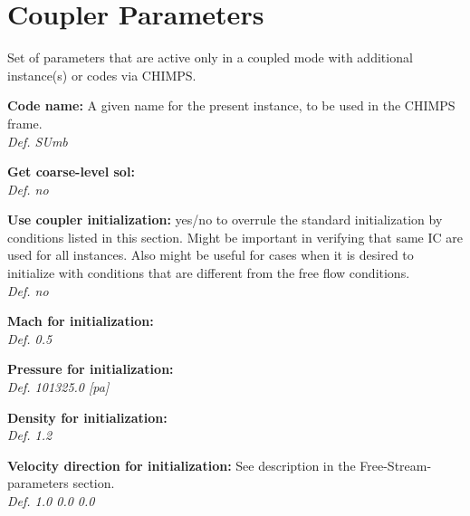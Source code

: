 \documentclass[12pt,epsf,colordvi]{article}
\begin{document}
\section{ Coupler  Parameters} \label{sec:coupler}
% 
Set of parameters that are active only in a coupled mode with additional instance(s) or codes via CHIMPS. 
%
\begin{description}
% 
	\item{\bf Code name:}  A given name for the present instance, to be used in the CHIMPS frame.\\
{\it Def. SUmb }
%
        \item{\bf Get coarse-level sol: } \\ 
{\it Def. no}
%
         \item{\bf  Use coupler initialization:} yes/no to overrule the standard initialization by conditions listed in this section. Might be important in verifying that same IC are used for all instances. Also might be useful for cases when it is desired to initialize with conditions that are different from the free flow conditions. \\
{\it Def. no}
%
        \item{\bf Mach for initialization: } \\
{\it Def. 0.5 }
%
        \item{\bf Pressure for initialization: } \\
{\it Def. 101325.0 [pa] }
%
        \item{\bf  Density for initialization: } \\
{\it Def.  1.2 }
%
        \item{\bf Velocity direction for initialization: } See description in the Free-Stream-parameters section. \\
{\it Def. 1.0 0.0 0.0}
%
\end{description}
%
\noindent 
\end{document}

